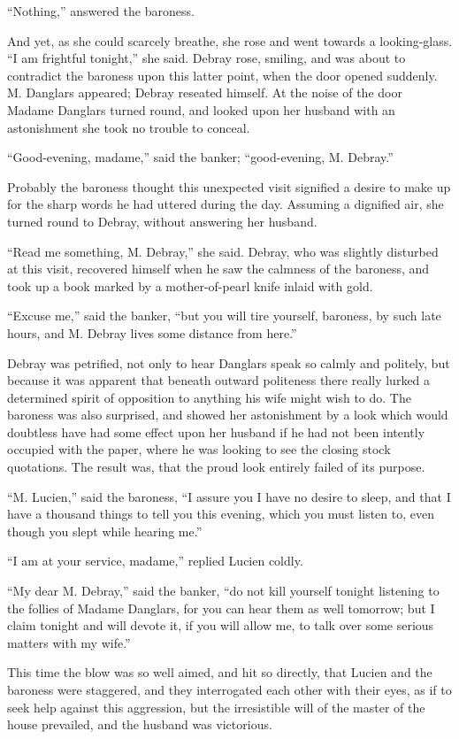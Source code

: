 “Nothing,” answered the baroness.

And yet, as she could scarcely breathe, she rose and went towards a
looking-glass. “I am frightful tonight,” she said. Debray rose,
smiling, and was about to contradict the baroness upon this latter
point, when the door opened suddenly. M. Danglars appeared; Debray
reseated himself. At the noise of the door Madame Danglars turned
round, and looked upon her husband with an astonishment she took no
trouble to conceal.

“Good-evening, madame,” said the banker; “good-evening, M. Debray.”

Probably the baroness thought this unexpected visit signified a desire
to make up for the sharp words he had uttered during the day. Assuming
a dignified air, she turned round to Debray, without answering her
husband.

“Read me something, M. Debray,” she said. Debray, who was slightly
disturbed at this visit, recovered himself when he saw the calmness of
the baroness, and took up a book marked by a mother-of-pearl knife
inlaid with gold.

“Excuse me,” said the banker, “but you will tire yourself, baroness, by
such late hours, and M. Debray lives some distance from here.”

Debray was petrified, not only to hear Danglars speak so calmly and
politely, but because it was apparent that beneath outward politeness
there really lurked a determined spirit of opposition to anything his
wife might wish to do. The baroness was also surprised, and showed her
astonishment by a look which would doubtless have had some effect upon
her husband if he had not been intently occupied with the paper, where
he was looking to see the closing stock quotations. The result was,
that the proud look entirely failed of its purpose.

“M. Lucien,” said the baroness, “I assure you I have no desire to
sleep, and that I have a thousand things to tell you this evening,
which you must listen to, even though you slept while hearing me.”

“I am at your service, madame,” replied Lucien coldly.

“My dear M. Debray,” said the banker, “do not kill yourself tonight
listening to the follies of Madame Danglars, for you can hear them as
well tomorrow; but I claim tonight and will devote it, if you will
allow me, to talk over some serious matters with my wife.”

This time the blow was so well aimed, and hit so directly, that Lucien
and the baroness were staggered, and they interrogated each other with
their eyes, as if to seek help against this aggression, but the
irresistible will of the master of the house prevailed, and the husband
was victorious.

